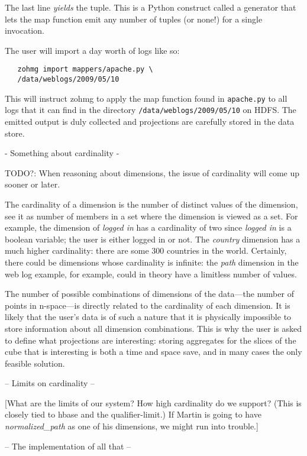 \documentclass[a4paper,10pt]{book}
\begin{document}
The last line \textit{yields} the tuple. This is a Python construct called a
generator that lets the map function emit any number of tuples (or none!)
for a single invocation.

The user will import a day worth of logs like so:

\begin{verbatim}
   zohmg import mappers/apache.py \
   /data/weblogs/2009/05/10
\end{verbatim}

This will instruct zohmg to apply the map function found in \texttt{apache.py}
to all logs that it can find in the directory
\texttt{/data/weblogs/2009/05/10} on HDFS. The emitted output is duly
collected and projections are carefully stored in the data store.

- Something about cardinality -

TODO?: When reasoning about dimensions, the issue of cardinality will come
up sooner or later.

The cardinality of a dimension is the number of distinct values of the
dimension, see it as number of members in a set where the dimension is
viewed as a set. For example, the dimension of \textit{logged in} has a
cardinality of two since \textit{logged in} is a boolean variable; the user
is either logged in or not. The \textit{country} dimension has a much
higher cardinality: there are some 300 countries in the world. Certainly,
there could be dimensions whose cardinality is infinite: the \textit{path}
dimension in the web log example, for example, could in theory have a
limitless number of values.

The number of possible combinations of dimensions of the data---the number
of points in n-space---is directly related to the cardinality of each
dimension. It is likely that the user's data is of such a nature that it is
physically impossible to store information about all dimension
combinations.  This is why the user is asked to define what projections are
interesting: storing aggregates for the slices of the cube that is
interesting is both a time and space save, and in many cases the only
feasible solution.

-- Limits on cardinality --

[What are the limits of our system? How high cardinality do we support? (This
is closely tied to hbase and the qualifier-limit.) If Martin is going to have
\textit{normalized\_path} as one of his dimensions, we might run into trouble.]

-- The implementation of all that --
\end{document}
